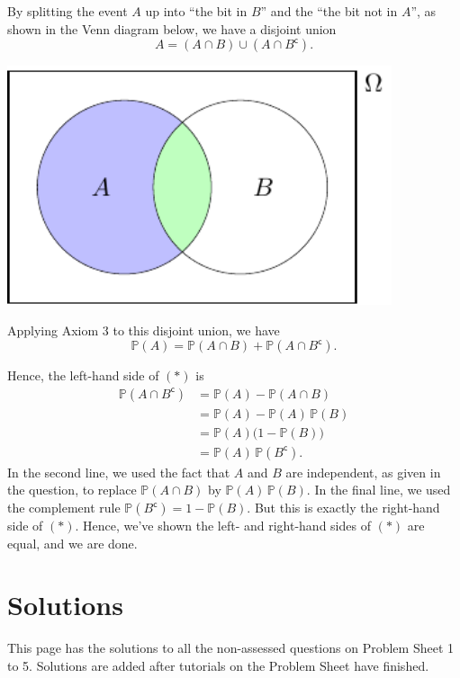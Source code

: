 \documentclass[
  a4paper,
]{book}
\newif\ifcomm\commtrue
\theoremstyle{definition}
\theoremstyle{definition}
\theoremstyle{definition}
\theoremstyle{definition}
\theoremstyle{remark}
\begin{document}
By splitting the event \(A\) up into ``the bit in \(B\)'' and the ``the bit not in \(A\)'', as shown in the Venn diagram below, we have a disjoint union
\[ A = (A \cap B) \cup (A \cap B^\mathsf{c}) . \]

\begin{center}\includegraphics[width=320pt]{math1710_files/figure-latex/writing-pic-1-1} \end{center}

Applying Axiom 3 to this disjoint union, we have
\[ \mathbb P(A) = \mathbb P(A \cap B) + \mathbb P(A \cap B^\mathsf{c}) . \]

Hence, the left-hand side of \((*)\) is
\begin{align*}
\mathbb P(A \cap B^\mathsf{c})
&= \mathbb P(A) - \mathbb P(A \cap B) \\
&= \mathbb P(A) - \mathbb P(A)\,\mathbb P(B) \\
&= \mathbb P(A) \big(1 - \mathbb P(B)\big) \\
&= \mathbb P(A) \, \mathbb P(B^\mathsf{c}) .
\end{align*}
In the second line, we used the fact that \(A\) and \(B\) are independent, as given in the question, to replace \(\mathbb P(A \cap B)\) by \(\mathbb P(A)\,\mathbb P(B)\). In the final line, we used the complement rule \(\mathbb P(B^\mathsf{c}) = 1 - \mathbb P(B)\). But this is exactly the right-hand side of \((*)\).
Hence, we've shown the left- and right-hand sides of \((*)\) are equal, and we are done.

\commtrue

\hypertarget{solutions}{%
\chapter*{Solutions}\label{solutions}}

This page has the solutions to all the non-assessed questions on Problem Sheet 1 to 5. Solutions are added after tutorials on the Problem Sheet have finished.
\end{document}
